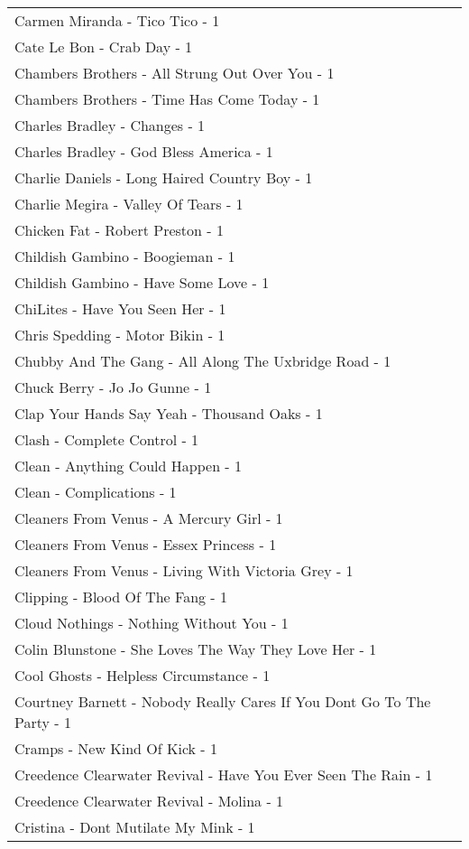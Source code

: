 \documentclass[
]{article}
\begin{document}
\begin{longtable}{l}
Carmen Miranda - Tico Tico - 1 \\ 
Cate Le Bon - Crab Day - 1 \\ 
Chambers Brothers - All Strung Out Over You - 1 \\ 
Chambers Brothers - Time Has Come Today - 1 \\ 
Charles Bradley - Changes - 1 \\ 
Charles Bradley - God Bless America - 1 \\ 
Charlie Daniels - Long Haired Country Boy - 1 \\ 
Charlie Megira - Valley Of Tears - 1 \\ 
Chicken Fat - Robert Preston - 1 \\ 
Childish Gambino - Boogieman - 1 \\ 
Childish Gambino - Have Some Love - 1 \\ 
ChiLites - Have You Seen Her - 1 \\ 
Chris Spedding - Motor Bikin - 1 \\ 
Chubby And The Gang - All Along The Uxbridge Road - 1 \\ 
Chuck Berry - Jo Jo Gunne - 1 \\ 
Clap Your Hands Say Yeah - Thousand Oaks - 1 \\ 
Clash - Complete Control - 1 \\ 
Clean - Anything Could Happen - 1 \\ 
Clean - Complications - 1 \\ 
Cleaners From Venus - A Mercury Girl - 1 \\ 
Cleaners From Venus - Essex Princess - 1 \\ 
Cleaners From Venus - Living With Victoria Grey - 1 \\ 
Clipping - Blood Of The Fang - 1 \\ 
Cloud Nothings - Nothing Without You - 1 \\ 
Colin Blunstone - She Loves The Way They Love Her - 1 \\ 
Cool Ghosts - Helpless Circumstance - 1 \\ 
Courtney Barnett - Nobody Really Cares If You Dont Go To The Party - 1 \\ 
Cramps - New Kind Of Kick - 1 \\ 
Creedence Clearwater Revival - Have You Ever Seen The Rain - 1 \\ 
Creedence Clearwater Revival - Molina - 1 \\ 
Cristina - Dont Mutilate My Mink - 1 \\ 

\end{longtable}
\end{document}
